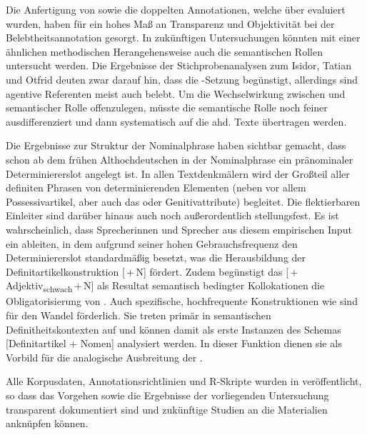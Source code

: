 Die Anfertigung von  sowie die doppelten  Annotationen, welche über  evaluiert wurden, haben für ein hohes Maß an Transparenz und Objektivität  bei der   Belebtheitsannotation  gesorgt. In zukünftigen Untersuchungen könnten mit einer ähnlichen methodischen Herangehensweise auch die semantischen Rollen  untersucht werden. Die Ergebnisse der Stichprobenanalysen zum Isidor, Tatian und Otfrid deuten zwar darauf hin, dass  die -Setzung begünstigt, allerdings sind agentive Referenten meist auch belebt. Um die Wechselwirkung zwischen  und semantischer Rolle  offenzulegen, müsste die semantische Rolle noch feiner ausdifferenziert und dann systematisch auf die ahd. Texte übertragen werden. 

Die Ergebnisse zur Struktur  der  Nominalphrase haben sichtbar gemacht, dass schon ab dem frühen Althochdeutschen in der Nominalphrase ein pränominaler  Determiniererslot  angelegt ist. In allen Textdenkmälern wird der Großteil aller definiten Phrasen von determinierenden Elementen (neben  vor allem  Possessivartikel, aber auch das   oder  Genitivattribute) begleitet. Die flektierbaren  Einleiter sind darüber hinaus auch noch außerordentlich stellungsfest. Es ist wahrscheinlich, dass Sprecherinnen und Sprecher aus diesem empirischen Input ein  ableiten, in dem  aufgrund seiner hohen Gebrauchsfrequenz den Determiniererslot standardmäßig besetzt, was die Herausbildung  der Definitartikelkonstruktion  [\,+\,N] fördert. Zudem begünstigt das   [\,+\,Adjektiv\textsubscript{schwach}\,+\,N] als Resultat semantisch bedingter Kollokationen die Obligatorisierung von . Auch spezifische, hochfrequente Konstruktionen  wie  sind für den Wandel förderlich. Sie treten primär in semantischen  Definitheitskontexten  auf und können damit als erste Instanzen des Schemas  [Definitartikel + Nomen] analysiert werden. In dieser Funktion dienen sie als Vorbild für die analogische  Ausbreitung der . 

Alle Korpusdaten, Annotationsrichtlinien und R-Skripte wurden in 
\textcite{HZKYL4_2020} veröffentlicht, so dass das Vorgehen sowie die Ergebnisse der  vorliegenden Untersuchung transparent dokumentiert sind und zukünftige Studien an die Materialien anknüpfen können.



